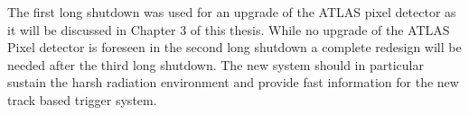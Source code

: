The first long shutdown was used for an upgrade of the ATLAS pixel detector as it will be discussed in Chapter 3 of this thesis. While no upgrade of the ATLAS Pixel detector is foreseen in the second long shutdown a complete redesign will be needed after the third long shutdown. The new system should in particular sustain the harsh radiation environment and provide fast information for the new track based trigger system.


\pagebreak
